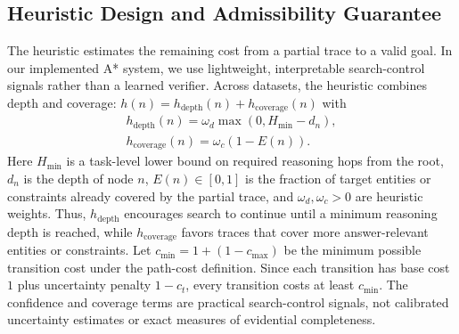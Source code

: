 \documentclass[10pt]{article}
\begin{document}






\subsection{Heuristic Design and Admissibility Guarantee}
\label{sec:heuristic_design}

The heuristic estimates the remaining cost from a partial trace to a valid goal. In our implemented A* system, we use lightweight, interpretable search-control signals rather than a learned verifier. Across datasets, the heuristic combines depth and coverage: $h(n)=h_{\mathrm{depth}}(n)+h_{\mathrm{coverage}}(n)$ with
\begin{multline}
h_{\mathrm{depth}}(n)=\omega_d\max(0,H_{\min}-d_n),
\\
h_{\mathrm{coverage}}(n)=\omega_c(1-E(n)).
\end{multline}
Here \(H_{\min}\) is a task-level lower bound on required reasoning hops from the root, \(d_n\) is the depth of node \(n\), \(E(n)\in[0,1]\) is the fraction of target entities or constraints already covered by the partial trace, and \(\omega_d,\omega_c>0\) are heuristic weights. Thus, \(h_{\mathrm{depth}}\) encourages search to continue until a minimum reasoning depth is reached, while \(h_{\mathrm{coverage}}\) favors traces that cover more answer-relevant entities or constraints. Let $c_{\min}=1+(1-c_{\max})$ be the minimum possible transition cost under the path-cost definition. Since each transition has base cost \(1\) plus uncertainty penalty \(1-c_t\), every transition costs at least \(c_{\min}\). The confidence and coverage terms are practical search-control signals, not calibrated uncertainty estimates or exact measures of evidential completeness.
\end{document}
